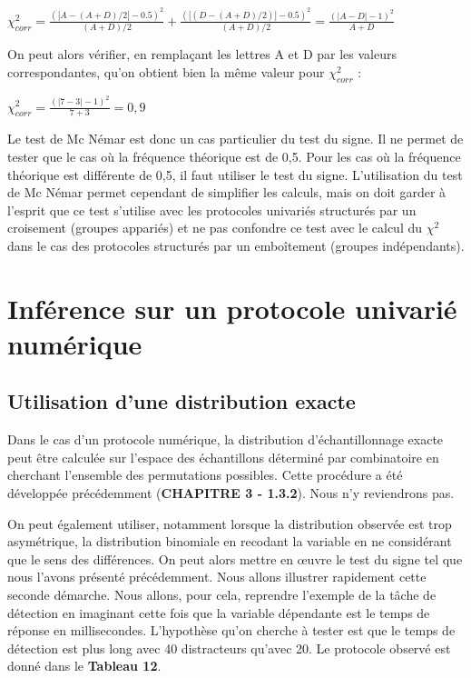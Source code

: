 \documentclass[]{book}
\theoremstyle{definition}
\theoremstyle{definition}
\theoremstyle{definition}
\theoremstyle{remark}
\begin{document}
\(\chi_{corr}^{2} = \frac{(\left | A-(A+D)/2 \right |-0.5)^{2}}{(A+D)/2}+\frac{(\left | (D-(A+D)/2) \right |-0.5)^{2}}{(A+D)/2}= \frac{(\left | A-D \right |-1)^{2}}{A+D}\)

On peut alors vérifier, en remplaçant les lettres A et D par les valeurs
correspondantes, qu'on obtient bien la même valeur pour
\(\chi ^2_{corr}\) :

\(\chi_{corr}^{2} = \frac{(\left | 7-3 \right |-1)^{2}}{7+3} = 0,9\)

Le test de Mc Némar est donc un cas particulier du test du signe. Il ne
permet de tester que le cas où la fréquence théorique est de 0,5. Pour
les cas où la fréquence théorique est différente de 0,5, il faut
utiliser le test du signe. L'utilisation du test de Mc Némar permet
cependant de simplifier les calculs, mais on doit garder à l'esprit que
ce test s'utilise avec les protocoles univariés structurés par un
croisement (groupes appariés) et ne pas confondre ce test avec le calcul
du \(\chi^{2}\) dans le cas des protocoles structurés par un emboîtement
(groupes indépendants).

\hypertarget{inference-sur-un-protocole-univarie-numerique-1}{%
\section{Inférence sur un protocole univarié
numérique}\label{inference-sur-un-protocole-univarie-numerique-1}}

\hypertarget{utilisation-dune-distribution-exacte-3}{%
\subsection{Utilisation d'une distribution
exacte}\label{utilisation-dune-distribution-exacte-3}}

Dans le cas d'un protocole numérique, la distribution d'échantillonnage
exacte peut être calculée sur l'espace des échantillons déterminé par
combinatoire en cherchant l'ensemble des permutations possibles. Cette
procédure a été développée précédemment (\textbf{CHAPITRE 3 - 1.3.2}).
Nous n'y reviendrons pas.

On peut également utiliser, notamment lorsque la distribution observée
est trop asymétrique, la distribution binomiale en recodant la variable
en ne considérant que le sens des différences. On peut alors mettre en
œuvre le test du signe tel que nous l'avons présenté précédemment. Nous
allons illustrer rapidement cette seconde démarche. Nous allons, pour
cela, reprendre l'exemple de la tâche de détection en imaginant cette
fois que la variable dépendante est le temps de réponse en
millisecondes. L'hypothèse qu'on cherche à tester est que le temps de
détection est plus long avec 40 distracteurs qu'avec 20. Le protocole
observé est donné dans le \textbf{Tableau 12}.
\end{document}
